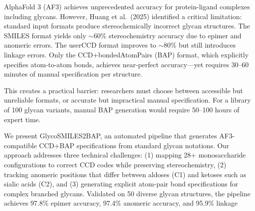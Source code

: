\documentclass[11pt,a4paper]{article}
\begin{document}
AlphaFold 3 (AF3) achieves unprecedented accuracy for protein-ligand complexes including glycans. However, Huang et al.\ (2025) identified a critical limitation: standard input formats produce stereochemically incorrect glycan structures. The SMILES format yields only $\sim$60\% stereochemistry accuracy due to epimer and anomeric errors. The userCCD format improves to $\sim$80\% but still introduces linkage errors. Only the CCD+bondedAtomPairs (BAP) format, which explicitly specifies atom-to-atom bonds, achieves near-perfect accuracy---yet requires 30--60 minutes of manual specification per structure.

This creates a practical barrier: researchers must choose between accessible but unreliable formats, or accurate but impractical manual specification. For a library of 100 glycan variants, manual BAP generation would require 50--100 hours of expert time.

We present GlycoSMILES2BAP, an automated pipeline that generates AF3-compatible CCD+BAP specifications from standard glycan notations. Our approach addresses three technical challenges: (1) mapping 28+ monosaccharide configurations to correct CCD codes while preserving stereochemistry, (2) tracking anomeric positions that differ between aldoses (C1) and ketoses such as sialic acids (C2), and (3) generating explicit atom-pair bond specifications for complex branched glycans. Validated on 50 diverse glycan structures, the pipeline achieves 97.8\% epimer accuracy, 97.4\% anomeric accuracy, and 95.9\% linkage
\end{document}
